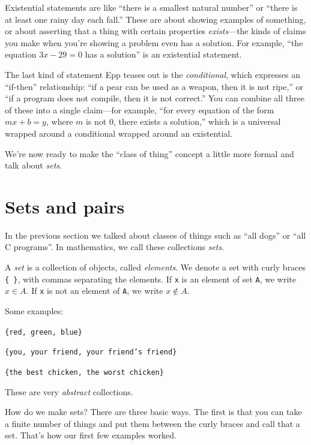 \documentclass[11pt]{article}
\begin{document}
Existential statements are like ``there is a smallest natural number'' or ``there is at least one rainy day each fall.'' These are about showing examples of something, or about asserting that a thing with certain properties \emph{exists}---the kinds of claims you make when you're showing a problem even has a solution. For example, ``the equation $3x - 29 = 0$ has a solution'' is an existential statement.

The last kind of statement Epp teases out is the \emph{conditional}, which expresses an ``if-then'' relationship: ``if a pear can be used as a weapon, then it is not ripe,'' or ``if a program does not compile, then it is not correct.'' You can combine all three of these into a single claim---for example, ``for every equation of the form $mx + b = y$, where $m$ is not $0$, there exists a solution,'' which is a universal wrapped around a conditional wrapped around an existential.

We're now ready to make the ``class of thing'' concept a little more formal and talk about \emph{sets}.

\section{Sets and pairs}
In the previous section we talked about classes of things such as ``all dogs'' or ``all C programs''. In mathematics, we call these collections \emph{sets}.

\begin{definition}[Set]
A \emph{set} is a collection of objects, called \emph{elements}. We denote a set with curly braces \texttt{\{ \}}, with commas separating the elements. If \texttt{x} is an element of set \texttt{A}, we write $x \in A$. If \texttt{x} is not an element of \texttt{A}, we write $x \notin A$.
\end{definition}

Some examples:

\texttt{\{red, green, blue\}}

\texttt{\{you, your friend, your friend's friend\}}

\texttt{\{the best chicken, the worst chicken\}}

These are very \emph{abstract} collections.

How do we make sets? There are three basic ways.
The first is that you can take a finite number of things and put them between the curly braces and call that a set. That's how our first few examples worked.
\end{document}
